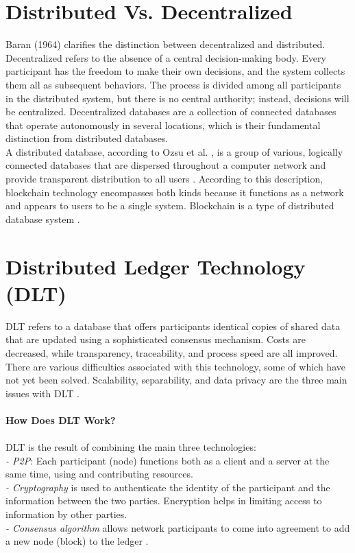 \section{Distributed Vs. Decentralized} 
Baran (1964) \cite{Baran} clarifies the distinction between decentralized and distributed. Decentralized refers to the absence of a central decision-making body. Every participant has the freedom to make their own decisions, and the system collects them all as subsequent behaviors. The process is divided among all participants in the distributed system, but there is no central authority; instead, decisions will be centralized. Decentralized databases are a collection of connected databases that operate autonomously in several locations, which is their fundamental distinction from distributed databases. \\
A distributed database, according to Ozsu et al. \cite{Ozsu}, is a group of various, logically connected databases that are dispersed throughout a computer network and provide transparent distribution to all users \cite{Ozsu}. 
According to this description, blockchain technology encompasses both kinds because it functions as a network and appears to users to be a single system. Blockchain is a type of distributed database system \cite{Ozsu}.


\section{Distributed Ledger Technology (DLT)} 
DLT refers to a database that offers participants identical copies of shared data that are updated using a sophisticated consensus mechanism. Costs are decreased, while transparency, traceability, and process speed are all improved. \\
There are various difficulties associated with this technology, some of which have not yet been solved. Scalability, separability, and data privacy are the three main issues with DLT \cite{Jose}. \\
\\
\textbf{How Does DLT Work?}\\
\\
DLT is the result of combining the main three technologies: \\
\hspace{1cm}\textit{-  P2P}: Each participant (node) functions both as a client and a server at the same time, using and contributing resources.\\
\hspace{1cm}\textit{- Cryptography} is used to authenticate the identity of the participant and the information between the two parties. Encryption helps in limiting access to information by other parties. \\
\hspace{1cm}\textit{- Consensus algorithm} allows network participants to come into agreement to add a new node (block) to the ledger \cite{Jose}.\\
